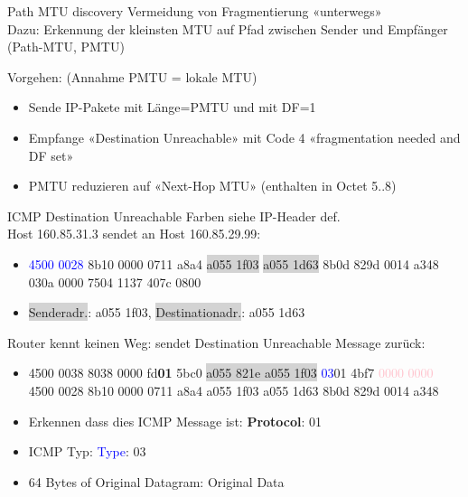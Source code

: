 \begin{KR}{Path MTU discovery} Vermeidung von Fragmentierung «unterwegs»\\
    Dazu: Erkennung der kleinsten MTU auf Pfad zwischen Sender und Empfänger (Path-MTU, PMTU)
    
    Vorgehen: (Annahme PMTU = lokale MTU)
    \begin{itemize}
        \item Sende IP-Pakete mit Länge=PMTU und mit DF=1
        \item Empfange «Destination Unreachable» mit Code 4 «fragmentation needed and DF set»
        \item PMTU reduzieren auf «Next-Hop MTU» (enthalten in Octet 5..8)
    \end{itemize}
\end{KR}

\begin{example2}{ICMP Destination Unreachable} Farben siehe IP-Header def.\\
    Host 160.85.31.3 sendet an Host 160.85.29.99:
    \begin{itemize}
        \item \textcolor{blue}{4500 0028} \textcolor{darkcorn}{8b10 0000} \textcolor{darkfrog}{0711} \textcolor{darkpurple}{a8a4 \colorbox{lightgrey}{a055 1f03} \colorbox{lightgrey}{a055 1d63} 8b0d 829d 0014 a348 030a 0000 7504 1137 407c 0800}
        \item \colorbox{lightgrey}{Senderadr.}: a055 1f03, \colorbox{lightgrey}{Destinationadr.}: a055 1d63
    \end{itemize}
    Router kennt keinen Weg: sendet Destination Unreachable Message zurück:
    \begin{itemize}
        \item 4500 0038 8038 0000 fd\textbf{01} 5bc0 \colorbox{lightgrey}{a055 821e a055 1f03} \textcolor{blue}{03}\textcolor{darkfrog}{01 4bf7} \textcolor{pink}{0000 0000} \textcolor{darkpurple}{4500 0028 8b10 0000 0711 a8a4 a055 1f03 a055 1d63 8b0d 829d 0014 a348}
        \item Erkennen dass dies ICMP Message ist: \textbf{Protocol}: 01
        \item ICMP Typ: \textcolor{blue}{Type}: 03
        \item 64 Bytes of Original Datagram: \textcolor{darkpurple}{Original Data}
    \end{itemize}
\end{example2}













